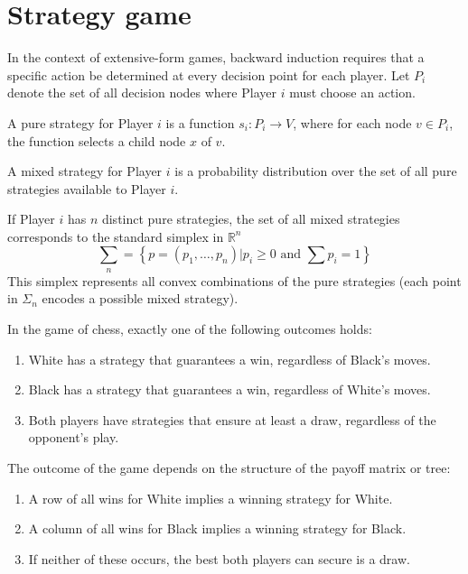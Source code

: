 \section{Strategy game}

In the context of extensive-form games, backward induction requires that a specific action be determined at every decision point for each player. 
Let $P_i$ denote the set of all decision nodes where Player $i$ must choose an action.
\begin{definition}
    A pure strategy for Player $i$ is a function $s_i:P_i\rightarrow V$, where for each node $v \in P_i$, the function selects a child node $x$ of $v$. 
\end{definition}
\begin{definition}
    A mixed strategy for Player $i$ is a probability distribution over the set of all pure strategies available to Player $i$. 
\end{definition}
\noindent If Player $i$ has $n$ distinct pure strategies, the set of all mixed strategies corresponds to the standard simplex in $\mathbb{R}^n$
\[\sum_n=\left\{p=(p_1,\dots,p_n)|p_i\geq 0 \text{ and }\sum{p_i}=1\right\}\]
This simplex represents all convex combinations of the pure strategies (each point in $\Sigma_n$ encodes a possible mixed strategy).

\begin{theorem}
    In the game of chess, exactly one of the following outcomes holds:
    \begin{enumerate}
        \item White has a strategy that guarantees a win, regardless of Black's moves.
        \item Black has a strategy that guarantees a win, regardless of White's moves.
        \item Both players have strategies that ensure at least a draw, regardless of the opponent's play.
    \end{enumerate}
\end{theorem}
\noindent The outcome of the game depends on the structure of the payoff matrix or tree:
\begin{enumerate}
    \item A row of all wins for White implies a winning strategy for White.
    \item A column of all wins for Black implies a winning strategy for Black.
    \item If neither of these occurs, the best both players can secure is a draw.
\end{enumerate}